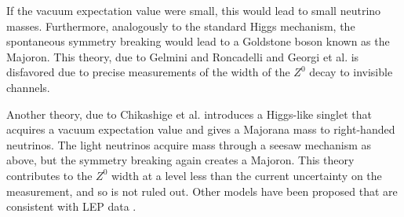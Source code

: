 \documentclass[herrin-thesis.tex]{subfiles}
\begin{document}
If the vacuum expectation value were small, this would lead to small neutrino masses. Furthermore, analogously to the standard Higgs mechanism, the spontaneous symmetry breaking would lead to a Goldstone boson known as the Majoron. This theory, due to Gelmini and Roncadelli\cite{Gelmini:1981uq} and Georgi et al.\cite{Georgi:1981kx} is disfavored due to precise measurements of the width of the \(Z^{0}\) decay to invisible channels.

Another theory, due to Chikashige et al.\cite{Chikashige:1981vn} introduces a Higgs-like singlet that acquires a vacuum expectation value and gives a Majorana mass to right-handed neutrinos. The light neutrinos acquire mass through a seesaw mechanism as above, but the symmetry breaking again creates a Majoron. This theory contributes to the \(Z^{0}\) width at a level less than the current uncertainty on the measurement, and so is not ruled out. Other models have been proposed that are consistent with LEP data \cite{Berezhiani199299}\cite{Bamert:1995fk}.
\end{document}
